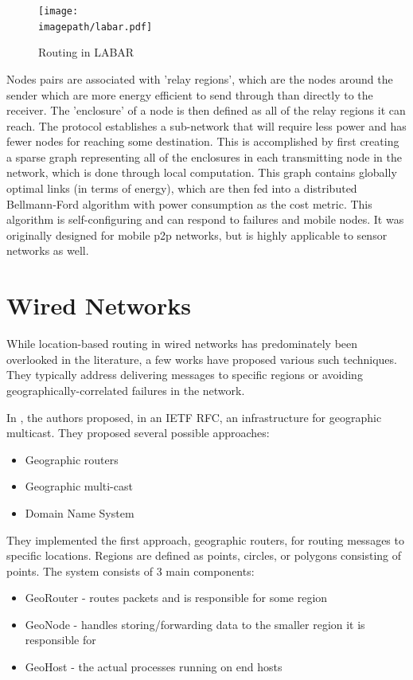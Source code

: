 \documentclass[conference]{IEEEtran}
\newcommand{\imagepath}{../../images/external/location_routing}
\begin{document}
\begin{figure}
\label{fig:labar-routing}
\centering
\texttt{[image: \\imagepath/labar.pdf]}
\caption{Routing in LABAR}
\end{figure}

\cite{Rodoplu} Nodes pairs are associated with 'relay regions', which are the nodes around the sender which are more energy efficient to send through than directly to the receiver.  The 'enclosure' of a node is then defined as all of the relay regions it can reach.  The protocol establishes a sub-network that will require less power and has fewer nodes for reaching some destination.  This is accomplished by first creating a sparse graph representing all of the enclosures in each transmitting node in the network, which is done through local computation.  This graph contains globally optimal links (in terms of energy), which are then fed into a distributed Bellmann-Ford algorithm with power consumption as the cost metric.  This algorithm is self-configuring and can respond to failures and mobile nodes.  It was originally designed for mobile p2p networks, but is highly applicable to sensor networks as well.


\section{Wired Networks}

While location-based routing in wired networks has predominately been overlooked in the literature, a few works have proposed various such techniques.
They typically address delivering messages to specific regions or avoiding geographically-correlated failures in the network.

In \cite{Navas1997}, the authors proposed, in an IETF RFC, an infrastructure for geographic multicast.
They proposed several possible approaches:
\begin{itemize}
\item Geographic routers
\item Geographic multi-cast
\item Domain Name System
\end{itemize}

They implemented the first approach, geographic routers, for routing messages to specific locations.
Regions are defined as points, circles, or polygons consisting of points.
The system consists of 3 main components:
\begin{itemize}
\item GeoRouter - routes packets and is responsible for some region
\item GeoNode - handles storing/forwarding data to the smaller region it is responsible for
\item GeoHost - the actual processes running on end hosts 
\end{itemize}
\end{document}
